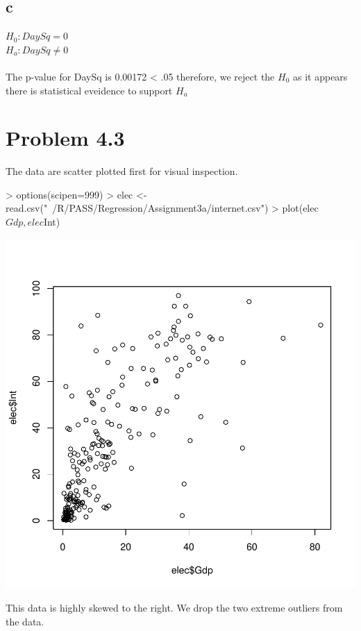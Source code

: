 \documentclass{article}
\begin{document}
\subsection*{c}
$H_0: DaySq=0$
\\
$H_a: DaySq\neq0$
\\\\
The p-value for DaySq is 0.00172 < .05 therefore, we reject the $H_0$ as it appears there is statistical eveidence to support $H_a$

\section*{Problem 4.3}
The data are scatter plotted first for visual inspection. 

\begin{Schunk}
\begin{Sinput}
> options(scipen=999)
> elec <- read.csv("~/R/PASS/Regression/Assignment3a/internet.csv")
> plot(elec$Gdp, elec$Int)
\end{Sinput}
\end{Schunk}
\includegraphics{Assignment3a-005}

This data is highly skewed to the right. We drop the two extreme outliers from the data. 
\begin{Schunk}
\end{Schunk}
\end{document}
